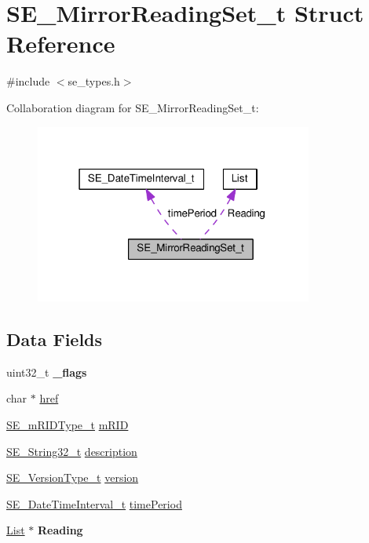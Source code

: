\hypertarget{structSE__MirrorReadingSet__t}{}\section{S\+E\+\_\+\+Mirror\+Reading\+Set\+\_\+t Struct Reference}
\label{structSE__MirrorReadingSet__t}


{\ttfamily \#include $<$se\+\_\+types.\+h$>$}



Collaboration diagram for S\+E\+\_\+\+Mirror\+Reading\+Set\+\_\+t\+:\nopagebreak
\begin{figure}[H]
\begin{center}
\leavevmode
\includegraphics[width=259pt]{structSE__MirrorReadingSet__t__coll__graph}
\end{center}
\end{figure}
\subsection*{Data Fields}
\begin{DoxyCompactItemize}
\item 
uint32\+\_\+t {\bfseries \+\_\+flags}
\item 
char $\ast$ \hyperlink{group__MirrorReadingSet_ga122a57ae501a13ce4ccb4b5f38348080}{href}
\item 
\hyperlink{group__mRIDType_gac74622112f3a388a2851b2289963ba5e}{S\+E\+\_\+m\+R\+I\+D\+Type\+\_\+t} \hyperlink{group__MirrorReadingSet_gab69106935620c1870a127bf728635d02}{m\+R\+ID}
\item 
\hyperlink{group__String32_gac9f59b06b168b4d2e0d45ed41699af42}{S\+E\+\_\+\+String32\+\_\+t} \hyperlink{group__MirrorReadingSet_gac4687cbf3cafae738001cac3eb928727}{description}
\item 
\hyperlink{group__VersionType_ga4b8d27838226948397ed99f67d46e2ae}{S\+E\+\_\+\+Version\+Type\+\_\+t} \hyperlink{group__MirrorReadingSet_gaea484e4cf9496a9f98da29f0759831c0}{version}
\item 
\hyperlink{structSE__DateTimeInterval__t}{S\+E\+\_\+\+Date\+Time\+Interval\+\_\+t} \hyperlink{group__MirrorReadingSet_gad45245dcd90b290a44555565a335aa64}{time\+Period}
\item 
\hyperlink{structList}{List} $\ast$ {\bfseries Reading}
\end{DoxyCompactItemize}


